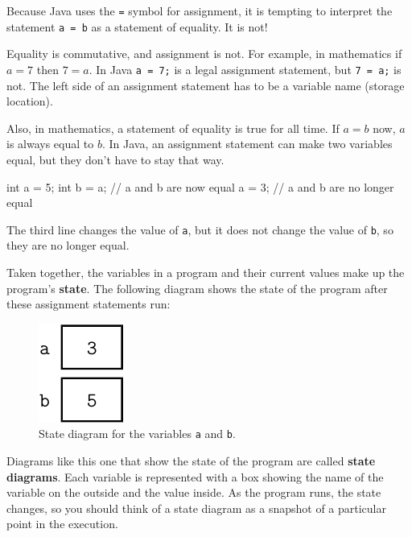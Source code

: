 \documentclass[12pt]{book}
\theoremstyle{exercise}
\newcommand{\java}[1]{\verb"#1"}
\begin{document}
Because Java uses the \java{=} symbol for assignment, it is tempting to interpret the statement \java{a = b} as a statement of equality.
It is not!

Equality is commutative, and assignment is not.
For example, in mathematics if $a = 7$ then $7 = a$.
In Java \java{a = 7;} is a legal assignment statement, but \java{7 = a;} is not.
The left side of an assignment statement has to be a variable name (storage location).

Also, in mathematics, a statement of equality is true for all time.
If $a = b$ now, $a$ is always equal to $b$.
In Java, an assignment statement can make two variables equal, but they don't have to stay that way.

\begin{code}
    int a = 5;
    int b = a;     // a and b are now equal
    a = 3;         // a and b are no longer equal
\end{code}

The third line changes the value of \java{a}, but it does not change the value of \java{b}, so they are no longer equal.


Taken together, the variables in a program and their current values make up the program's {\bf state}.
The following diagram shows the state of the program after these assignment statements run:

\begin{figure}[!ht]
\begin{center}
\includegraphics{figs/state.pdf}
\caption{State diagram for the variables \java{a} and \java{b}.}
\label{fig.state}
\end{center}
\end{figure}


Diagrams like this one that show the state of the program are called {\bf state diagrams}.
Each variable is represented with a box showing the name of the variable on the outside and the value inside.
As the program runs, the state changes, so you should think of a state diagram as a snapshot of a particular point in the execution.
\end{document}

